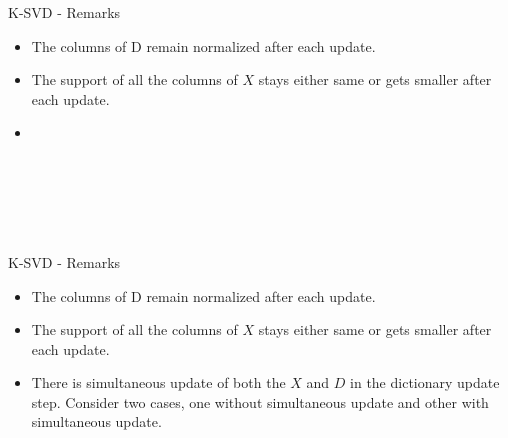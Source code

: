 \documentclass{beamer}
\begin{document}
\begin{frame}{K-SVD - Remarks}
\begin{itemize}
    \item The columns of D remain normalized after each update.
    \item The support of all the columns of $X$ stays either same or gets smaller after each update.
    \item[] \phantom{There is simultaneous update of both the $X$ and $D$ in the dictionary update step. Consider two cases, one without simultaneous update and other with simultaneous update.}
\end{itemize}
\[
\phantom{\hat{X}^{\,\mathrm{wsu}} = \hat{X}, 
\hat{D}^{\,\mathrm{wsu}} = \arg\min_{D} J(D,\hat{X})
\quad
\text{s.t. } \|d_j\|_2 = 1 \text{ for all } j}
\]
\[
\phantom{\hat{D}^{\,\mathrm{su}}, \hat{X}^{\,\mathrm{su}}
=
\arg\min_{D,X} J(D,X)
\quad
\text{s.t. } \|d_j\|_2 = 1 \text{ for all } j,\;
\operatorname{supp}(X) \subseteq \Omega}
\]
\[
\phantom{J(\hat{D}^{\,\mathrm{su}}, \hat{X}^{\,\mathrm{su}}) \leq J(\hat{D}^{\,\mathrm{wsu}}, \hat{X}^{\,\mathrm{wsu}})}
\]
\phantom{Case 1 has lesser search space and Case 2. So case 2 is likely to end up in a lesser minima than case 1.}
\end{frame}

\begin{frame}{K-SVD - Remarks}
\begin{itemize}
    \item The columns of D remain normalized after each update.
    \item The support of all the columns of $X$ stays either same or gets smaller after each update.
    \item There is simultaneous update of both the $X$ and $D$ in the dictionary update step. Consider two cases, one without simultaneous update and other with simultaneous update.
\end{itemize}
\[
\phantom{\hat{X}^{\,\mathrm{wsu}} = \hat{X}, 
\hat{D}^{\,\mathrm{wsu}} = \arg\min_{D} J(D,\hat{X})
\quad
\text{s.t. } \|d_j\|_2 = 1 \text{ for all } j}
\]
\[
\phantom{\hat{D}^{\,\mathrm{su}}, \hat{X}^{\,\mathrm{su}}
=
\arg\min_{D,X} J(D,X)
\quad
\text{s.t. } \|d_j\|_2 = 1 \text{ for all } j,\;
\operatorname{supp}(X) \subseteq \Omega}
\]
\[
\phantom{J(\hat{D}^{\,\mathrm{su}}, \hat{X}^{\,\mathrm{su}}) \leq J(\hat{D}^{\,\mathrm{wsu}}, \hat{X}^{\,\mathrm{wsu}})}
\]
\phantom{Case 1 has lesser search space and Case 2. So case 2 is likely to end up in a lesser minima than case 1.}
\end{frame}
\end{document}
